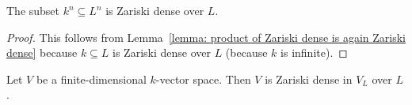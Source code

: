 \begin{corollary}
  \label{corollary: kn is Zariski dense in Ln}
  The subset $k^n \subseteq L^n$ is Zariski dense over $L$.
\end{corollary}


\begin{proof}
  This follows from Lemma~\ref{lemma: product of Zariski dense is again Zariski dense} because $k \subseteq L$ is Zariski dense over $L$ (because $k$ is infinite).
\end{proof}



%   
%   
%   


\begin{corollary}
  \label{corollary: V is Zariski dense in VL}
  Let $V$ be a finite-dimensional $k$-vector space.
  Then $V$ is Zariski dense in $V_L$ over $L$.
\end{corollary}



